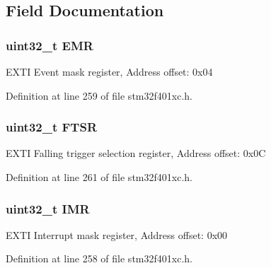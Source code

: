 \subsection{Field Documentation}
\subsubsection[{\texorpdfstring{E\+MR}{EMR}}]{ uint32\+\_\+t E\+MR}\hypertarget{struct_e_x_t_i___type_def_a6034c7458d8e6030f6dacecf0f1a3a89}{}\label{struct_e_x_t_i___type_def_a6034c7458d8e6030f6dacecf0f1a3a89}
E\+X\+TI Event mask register, Address offset\+: 0x04 

Definition at line 259 of file stm32f401xc.\+h.

\subsubsection[{\texorpdfstring{F\+T\+SR}{FTSR}}]{ uint32\+\_\+t F\+T\+SR}\hypertarget{struct_e_x_t_i___type_def_aa0f7c828c46ae6f6bc9f66f11720bbe6}{}\label{struct_e_x_t_i___type_def_aa0f7c828c46ae6f6bc9f66f11720bbe6}
E\+X\+TI Falling trigger selection register, Address offset\+: 0x0C 

Definition at line 261 of file stm32f401xc.\+h.

\subsubsection[{\texorpdfstring{I\+MR}{IMR}}]{ uint32\+\_\+t I\+MR}\hypertarget{struct_e_x_t_i___type_def_ae845b86e973b4bf8a33c447c261633f6}{}\label{struct_e_x_t_i___type_def_ae845b86e973b4bf8a33c447c261633f6}
E\+X\+TI Interrupt mask register, Address offset\+: 0x00 

Definition at line 258 of file stm32f401xc.\+h.

